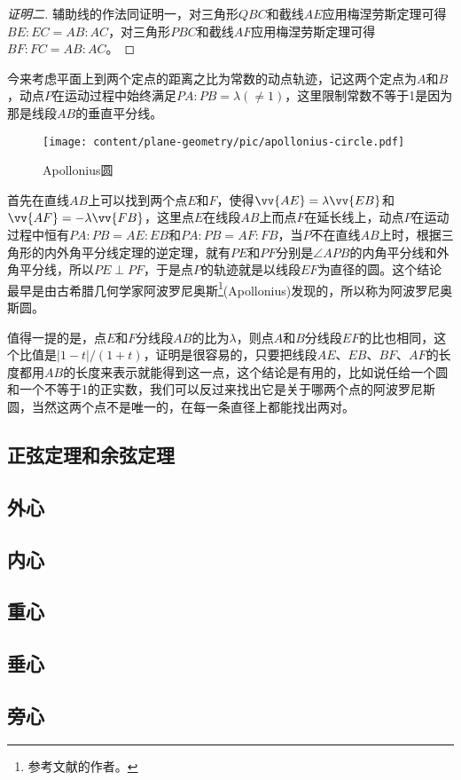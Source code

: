 \begin{proof}[证明二]
  辅助线的作法同证明一，对三角形$QBC$和截线$AE$应用梅涅劳斯定理可得$BE:EC=AB:AC$，对三角形$PBC$和截线$AF$应用梅涅劳斯定理可得$BF:FC=AB:AC$。
\end{proof}

\begin{example}[阿波罗尼奥斯圆]
  今来考虑平面上到两个定点的距离之比为常数的动点轨迹，记这两个定点为$A$和$B$，动点$P$在运动过程中始终满足$PA:PB=\lambda(\neq 1)$，这里限制常数不等于1是因为那是线段$AB$的垂直平分线。

\begin{figure}[htbp]
\centering
\texttt{[image: content/plane-geometry/pic/apollonius-circle.pdf]}
\caption{Apollonius圆}
\label{fig:apollonius-circle}
\end{figure}

 首先在直线$AB$上可以找到两个点$E$和$F$，使得$\vv{AE}=\lambda\vv{EB}$和$\vv{AF}=-\lambda\vv{FB}$，这里点$E$在线段$AB$上而点$F$在延长线上，动点$P$在运动过程中恒有$PA:PB=AE:EB$和$PA:PB=AF:FB$，当$P$不在直线$AB$上时，根据三角形的内外角平分线定理的逆定理，就有$PE$和$PF$分别是$\angle APB$的内角平分线和外角平分线，所以$PE \perp PF$，于是点$P$的轨迹就是以线段$EF$为直径的圆。这个结论最早是由古希腊几何学家阿波罗尼奥斯\footnote{参考文献\cite{conic-sections}的作者。}(Apollonius)发现的，所以称为阿波罗尼奥斯圆。

 值得一提的是，点$E$和$F$分线段$AB$的比为$\lambda$，则点$A$和$B$分线段$EF$的比也相同，这个比值是$|1-t|/(1+t)$，证明是很容易的，只要把线段$AE$、$EB$、$BF$、$AF$的长度都用$AB$的长度来表示就能得到这一点，这个结论是有用的，比如说任给一个圆和一个不等于1的正实数，我们可以反过来找出它是关于哪两个点的阿波罗尼斯圆，当然这两个点不是唯一的，在每一条直径上都能找出两对。
\end{example}

\subsection{正弦定理和余弦定理}
\label{sec:sine-theorem-and-cosine-theorem}

\subsection{外心}
\label{sec:triangle-excenter}

\subsection{内心}
\label{sec:triangle-incenter}

\subsection{重心}
\label{sec:triangle-centroid}

\subsection{垂心}
\label{sec:triangle-orthocentre}

\subsection{旁心}
\label{sec:escenter}



